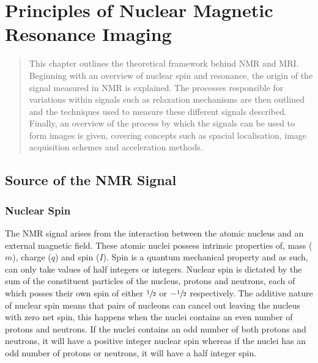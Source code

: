 \chapter{Principles of Nuclear Magnetic Resonance Imaging}
\label{chap:Theory}
\newpage
\begin{abstract}
	This chapter outlines the theoretical framework behind \ac{NMR} and \ac{MRI}. Beginning with an overview of nuclear spin and resonance, the origin of the signal measured in \ac{NMR} is explained. The processes responsible for variations within signals such as relaxation mechanisms are then outlined and the techniques used to measure these different signals described. Finally, an overview of the process by which the signals can be used to form images is given, covering concepts such as spacial localisation, image acquisition schemes and acceleration methods.
\end{abstract}
\newpage

\acresetall
\section{Source of the NMR Signal}
\label{sec:theory_source_of_nmr}

\subsection{Nuclear Spin}
\label{subsec:theory_nuclear_spin}
The \ac{NMR} signal arises from the interaction between the atomic nucleus and an external magnetic field. These atomic nuclei possess intrinsic properties of, mass ($m$), charge ($q$) and spin ($I$). Spin is a quantum mechanical property and as such, can only take values of half integers or integers. Nuclear spin is dictated by the sum of the constituent particles of the nucleus, protons and neutrons, each of which posses their own spin of either $\sfrac{1}{2}$ or $-\sfrac{1}{2}$ respectively. The additive nature of nuclear spin means that pairs of nucleons can cancel out leaving the nucleus with zero net spin, this happens when the nuclei contains an even number of protons and neutrons. If the nuclei contains an odd number of both protons and neutrons, it will have a positive integer nuclear spin whereas if the nuclei has an odd number of protons or neutrons, it will have a half integer spin. 


